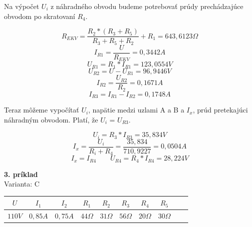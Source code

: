 \documentclass[a4paper,12pt]{article}
\begin{document}
\begin{flushleft}
Na výpočet $U_i$ z náhradného obvodu budeme potrebovať prúdy prechádzajúce obvodom po skratovaní $R_4$. 
\end{flushleft}
\begin{equation*}
R_{EKV} = \frac{R_{2}*(R_3+R_5)}{R_3+R_5+R_2}+R_1 = 643,6123\Omega
\end{equation*}
\begin{equation*}
I_{R1} = \frac{U}{R_{EKV}} = 0,3442 A
\end{equation*}
\begin{equation*}
U_{R1} = R_1*I_{R1} = 123,0554 V
\end{equation*}
\begin{equation*}
U_{R2} = U-U_{R1} = 96,9446 V
\end{equation*}
\begin{equation*}
I_{R2} = \frac{U_{R2}}{R_2} = 0,1671 A
\end{equation*}
\begin{equation*}
I_{R3} = I_{R1} - I_{R2} = 0,1748 A
\end{equation*}

\bigskip
\begin{flushleft}
Teraz môžeme vypočítať $U_i$, napätie medzi uzlami A a B a $I_x$, prúd pretekajúci náhradným obvodom. Platí, že $U_i$ = $U_{R3}$.
\end{flushleft}
\begin{equation*}
U_i = R_3 * I_{R3} = 35,834 V
\end{equation*}
\begin{equation*}
I_x = \frac{U_i}{R_i+R_4} = \frac{35,834}{710,9227} = 0,0504 A
\end{equation*}
\begin{equation*}
I_x = I_{R4} \qquad U_{R4} = R_4*I_{R4} = 28,224 V
\end{equation*}


\newpage
\begin{flushleft}
\textbf{3. príklad}\\
Varianta: C
\end{flushleft}

\begin{tabular}{|c|c|c|c|c|c|c|c|c|c|}
\hline $U$ & $I_1$ & $I_2$ & $R_1$ & $R_2$ & $R_3$ & $R_4$ & $R_5$ \\ 
\hline
$110V$ & $0,85A$ & $0,75A$ & $44\Omega$ & $31\Omega$ & $56\Omega$ & $20\Omega$ & $30\Omega$ \\ 
\hline
\end{tabular}
\bigskip
\end{document}
